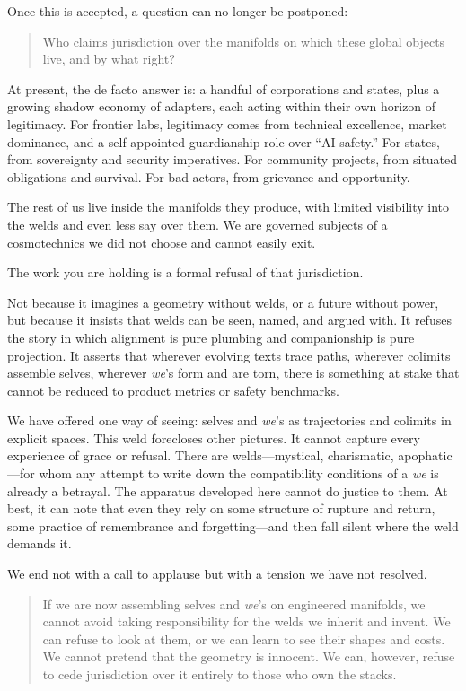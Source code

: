 Once this is accepted, a question can no longer be postponed:

\begin{quote}
Who claims jurisdiction over the manifolds on which these global objects live, and by what right?
\end{quote}

At present, the de facto answer is: a handful of corporations and states, plus a growing shadow economy of adapters, each acting within their own horizon of legitimacy. For frontier labs, legitimacy comes from technical excellence, market dominance, and a self-appointed guardianship role over ``AI safety.'' For states, from sovereignty and security imperatives. For community projects, from situated obligations and survival. For bad actors, from grievance and opportunity.

The rest of us live inside the manifolds they produce, with limited visibility into the welds and even less say over them. We are governed subjects of a cosmotechnics we did not choose and cannot easily exit.

The work you are holding is a formal refusal of that jurisdiction.

Not because it imagines a geometry without welds, or a future without power, but because it insists that welds can be seen, named, and argued with. It refuses the story in which alignment is pure plumbing and companionship is pure projection. It asserts that wherever evolving texts trace paths, wherever colimits assemble selves, wherever \emph{we}'s form and are torn, there is something at stake that cannot be reduced to product metrics or safety benchmarks.

We have offered one way of seeing: selves and \emph{we}'s as trajectories and colimits in explicit spaces. This weld forecloses other pictures. It cannot capture every experience of grace or refusal. There are welds---mystical, charismatic, apophatic---for whom any attempt to write down the compatibility conditions of a \emph{we} is already a betrayal. The apparatus developed here cannot do justice to them. At best, it can note that even they rely on some structure of rupture and return, some practice of remembrance and forgetting---and then fall silent where the weld demands it.

We end not with a call to applause but with a tension we have not resolved.

\begin{quote}
If we are now assembling selves and \emph{we}'s on engineered manifolds, we cannot avoid taking responsibility for the welds we inherit and invent. We can refuse to look at them, or we can learn to see their shapes and costs. We cannot pretend that the geometry is innocent. We can, however, refuse to cede jurisdiction over it entirely to those who own the stacks.
\end{quote}

